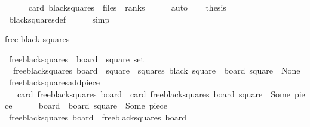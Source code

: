 \begin{isabellebody}
\ \ \isamarkupfalse%
\ {\isachardoublequoteopen}{}\ {\isacharasterisk}\ card\ {\isacharquery}black{\isacharunderscore}squares\ {\isacharequal}\ files\ {\isacharasterisk}\ ranks{\isachardoublequoteclose}\isanewline
\ \ \ \ \isamarkupfalse%
\ auto\isanewline
\ \ \isamarkupfalse%
\ {\isacharquery}thesis\isanewline
\ \ \ \ \isamarkupfalse%
\ black{\isacharunderscore}squares{\isacharunderscore}def\isanewline
\ \ \ \ \isamarkupfalse%
\ simp\isanewline
{}\isamarkupfalse%
%
\endisatagproof
{\isafoldproof}%
%
\isadelimproof
%
\endisadelimproof
%
\begin{isamarkuptext}%
free black squares%
\end{isamarkuptext}\isamarkuptrue%
\isamarkupfalse%
\ free{\isacharunderscore}black{\isacharunderscore}squares\ {\isacharcolon}{\isacharcolon}\ {\isachardoublequoteopen}board\ {\isasymRightarrow}\ square\ set{\isachardoublequoteclose}\ \isanewline
\ \ {\isachardoublequoteopen}free{\isacharunderscore}black{\isacharunderscore}squares\ board\ {\isacharequal}\ {\isacharbraceleft}square\ {\isasymin}\ squares{\isachardot}\ black\ square\ {\isasymand}\ board\ square\ {\isacharequal}\ None{\isacharbraceright}{\isachardoublequoteclose}\isanewline
\isanewline
{}\isamarkupfalse%
\ free{\isacharunderscore}black{\isacharunderscore}squares{\isacharunderscore}add{\isacharunderscore}piece{\isacharcolon}\isanewline
\ \ \ {\isachardoublequoteopen}card\ {\isacharparenleft}free{\isacharunderscore}black{\isacharunderscore}squares\ board{\isacharparenright}\ {\isasymle}\ card\ {\isacharparenleft}free{\isacharunderscore}black{\isacharunderscore}squares\ {\isacharparenleft}board\ {\isacharparenleft}square\ {\isacharcolon}{\isacharequal}\ Some\ piece{\isacharparenright}{\isacharparenright}{\isacharparenright}\ {\isacharplus}\ {}{\isachardoublequoteclose}\isanewline
%
\isadelimproof
%
\endisadelimproof
%
\isatagproof
{}\isamarkupfalse%
{\isacharminus}\isanewline
\ \ \isamarkupfalse%
\ {\isacharquery}board{\isacharprime}\ {\isacharequal}\ {\isachardoublequoteopen}board\ {\isacharparenleft}square\ {\isacharcolon}{\isacharequal}\ Some\ piece{\isacharparenright}{\isachardoublequoteclose}\isanewline
\ \ \isamarkupfalse%
\ {\isachardoublequoteopen}free{\isacharunderscore}black{\isacharunderscore}squares\ board\ {\isacharequal}\ free{\isacharunderscore}black{\isacharunderscore}squares\ {\isacharquery}board{\isacharprime}\ {\isasymor}\isanewline

\end{isabellebody}
